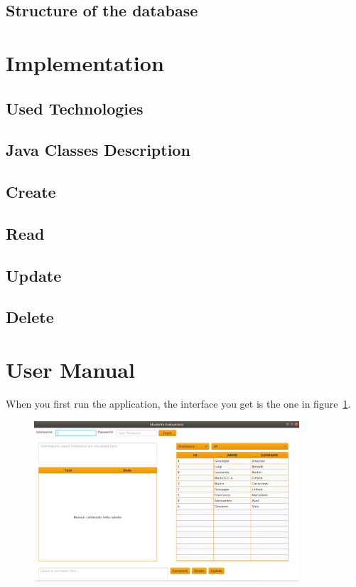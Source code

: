 \documentclass[a4paper]{article}
\begin{document}
\subsection{Structure of the database}

\clearpage
\section{Implementation}

\subsection{Used Technologies}

\subsection{Java Classes Description}

\subsection{Create}

\subsection{Read}

\subsection{Update}

\subsection{Delete}

\clearpage
\section{User Manual}
When you first run the application, the interface you get is the one in figure~\ref{fig:screen0}. 

\begin{figure}[h]
\centering
\includegraphics[width=0.88\textwidth]{images/screens/screen0}
\label{fig:screen0}
\end{figure}
\end{document}

